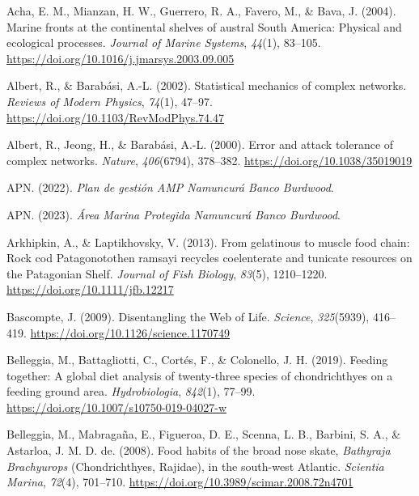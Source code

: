 \documentclass[preprint, 3p,
authoryear]{elsarticle} %
\newlength{\cslhangindent}
\newlength{\cslentryspacingunit} %
\newenvironment{CSLReferences}[2] %
 {%
  \setlength{\parindent}{0pt}
  \ifodd #1
  \let\oldpar\par
  \def\par{\hangindent=\cslhangindent\oldpar}
  \fi
  \setlength{\parskip}{#2\cslentryspacingunit}
 }%
 {}
\begin{document}
\hypertarget{refs}{}
\begin{CSLReferences}{1}{0}
\leavevmode{}%
Acha, E. M., Mianzan, H. W., Guerrero, R. A., Favero, M., \& Bava, J.
(2004). Marine fronts at the continental shelves of austral {South
America}: {Physical} and ecological processes. \emph{Journal of Marine
Systems}, \emph{44}(1), 83--105.
\url{https://doi.org/10.1016/j.jmarsys.2003.09.005}

\leavevmode{}%
Albert, R., \& Barabási, A.-L. (2002). Statistical mechanics of complex
networks. \emph{Reviews of Modern Physics}, \emph{74}(1), 47--97.
\url{https://doi.org/10.1103/RevModPhys.74.47}

\leavevmode{}%
Albert, R., Jeong, H., \& Barabási, A.-L. (2000). Error and attack
tolerance of complex networks. \emph{Nature}, \emph{406}(6794),
378--382. \url{https://doi.org/10.1038/35019019}

\leavevmode{}%
APN. (2022). \emph{Plan de gestión {AMP Namuncurá Banco Burdwood}}.

\leavevmode{}%
APN. (2023). \emph{Área {Marina Protegida Namuncurá Banco Burdwood}}.

\leavevmode{}%
Arkhipkin, A., \& Laptikhovsky, V. (2013). From gelatinous to muscle
food chain: Rock cod {Patagonotothen} ramsayi recycles coelenterate and
tunicate resources on the {Patagonian Shelf}. \emph{Journal of Fish
Biology}, \emph{83}(5), 1210--1220.
\url{https://doi.org/10.1111/jfb.12217}

\leavevmode{}%
Bascompte, J. (2009). Disentangling the {Web} of {Life}. \emph{Science},
\emph{325}(5939), 416--419.
\url{https://doi.org/10.1126/science.1170749}

\leavevmode{}%
Belleggia, M., Battagliotti, C., Cortés, F., \& Colonello, J. H. (2019).
Feeding together: A global diet analysis of twenty-three species of
chondrichthyes on a feeding ground area. \emph{Hydrobiologia},
\emph{842}(1), 77--99. \url{https://doi.org/10.1007/s10750-019-04027-w}

\leavevmode{}%
Belleggia, M., Mabragaña, E., Figueroa, D. E., Scenna, L. B., Barbini,
S. A., \& Astarloa, J. M. D. de. (2008). Food habits of the broad nose
skate, {\emph{Bathyraja}}{ \emph{Brachyurops}} ({Chondrichthyes},
{Rajidae}), in the south-west {Atlantic}. \emph{Scientia Marina},
\emph{72}(4), 701--710.
\url{https://doi.org/10.3989/scimar.2008.72n4701}


\end{CSLReferences}
\end{document}
